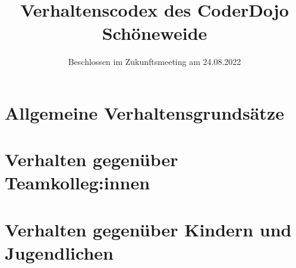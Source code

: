 \documentclass[11pt]{article}
\title{\huge\textbf{Verhaltenscodex des CoderDojo Schöneweide}}
\date{Beschlossen im Zukunftsmeeting am 24.08.2022}
\author{}
\begin{document}
    \maketitle


    \section{Allgemeine Verhaltensgrundsätze}
    \label{sec:allgemeine-verhaltensgrundsaetze}
    
    \newpage


    \section{Verhalten gegenüber Teamkolleg:innen}
    \label{sec:verhalten-gegenuber-teamkolleg:innen}
    
    \newpage


    \section{Verhalten gegenüber Kindern und Jugendlichen}
    \label{sec:verhalten-gegenueber-kindern-und-jugendlichen}
    
\end{document}
